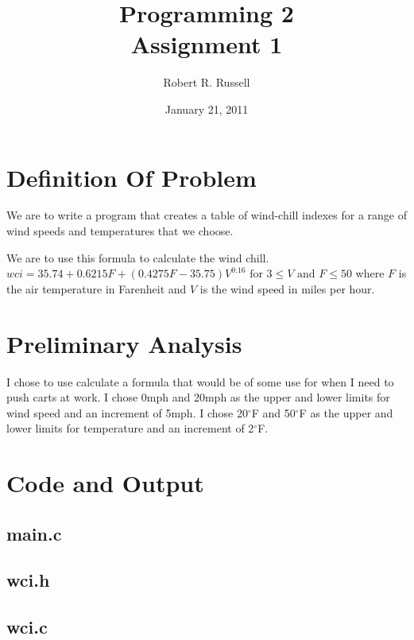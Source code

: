 \documentclass[letterpaper]{scrartcl}
\title{Programming 2\\Assignment 1}
\author{Robert R. Russell}
\date{January 21, 2011}
\begin{document}
\maketitle

\section{Definition Of Problem}
We are to write a program that creates a table of wind-chill indexes
for a range of wind speeds and temperatures that we choose.

We are to use this formula to calculate the wind chill.
\begin{math}
  wci = 35.74+0.6215F+(0.4275F-35.75)V^{0.16}\text{ for }3\leq{}V\text{ and }F\leq{}50
\end{math}
where $F$ is the air temperature in Farenheit and
$V$ is the wind speed in miles per hour.

\section{Preliminary Analysis}
I chose to use calculate a formula that would be of some use for when
I need to push carts at work. I chose 0mph and 20mph as the upper and
lower limits for wind speed and an increment of 5mph. I chose 20$^{\circ}$F and
50$^{\circ}$F as the upper and lower limits for temperature and an increment of 2$^{\circ}$F.

\newpage
\section{Code and Output}
\subsection{main.c}
\newpage
\subsection{wci.h}
\newpage
\subsection{wci.c}
\newpage
\end{document}
